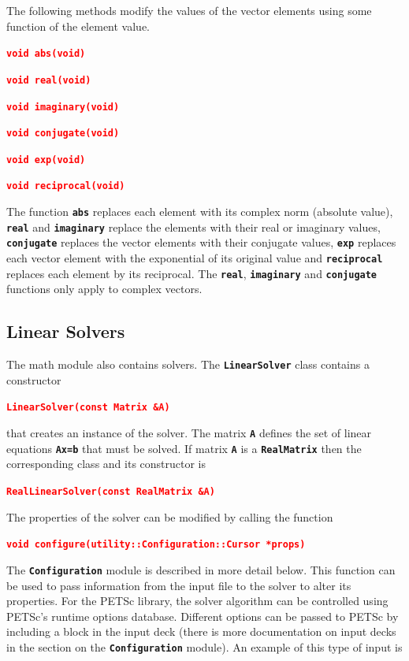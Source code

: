 \documentclass[12pt]{report} %
\begin{document}
The following methods modify the values of the vector elements using some function of the element value.

\textcolor{red}{\texttt{\textbf{void abs(void)}}}

\textcolor{red}{\texttt{\textbf{void real(void)}}}

\textcolor{red}{\texttt{\textbf{void imaginary(void)}}}

\textcolor{red}{\texttt{\textbf{void conjugate(void)}}}

\textcolor{red}{\texttt{\textbf{void exp(void)}}}

\textcolor{red}{\texttt{\textbf{void reciprocal(void)}}}

The function \texttt{\textbf{abs}} replaces each element with its complex norm (absolute value), \texttt{\textbf{real}} and \texttt{\textbf{imaginary}} replace the elements with their real or imaginary values, \texttt{\textbf{conjugate}} replaces the vector elements with their conjugate values, \texttt{\textbf{exp}} replaces each vector element with the exponential of its original value and \texttt{\textbf{reciprocal}} replaces each element by its reciprocal. The \texttt{\textbf{real}}, \texttt{\textbf{imaginary}} and \texttt{\textbf{conjugate}} functions only apply to complex vectors.

\subsection{Linear Solvers}

The math module also contains solvers. The \texttt{\textbf{LinearSolver}} class contains a constructor

\textcolor{red}{\texttt{\textbf{LinearSolver(const Matrix \&A)}}}

that creates an instance of the solver. The matrix \texttt{\textbf{A}} defines the set of linear equations \texttt{\textbf{Ax=b}} that must be solved. If matrix \texttt{\textbf{A}} is a \texttt{\textbf{RealMatrix}} then the corresponding class and its constructor is

\textcolor{red}{\texttt{\textbf{RealLinearSolver(const RealMatrix \&A)}}}

The properties of the solver can be modified by calling the function

\textcolor{red}{\texttt{\textbf{void configure(utility::Configuration::Cursor *props)}}}

The \texttt{\textbf{Configuration}} module is described in more detail below. This function can be used to pass information from the input file to the solver to alter its properties. For the PETSc library, the solver algorithm can be controlled using PETSc's runtime options database. Different options can be passed to PETSc by including a block in the input deck (there is more documentation on input decks in the section on the \texttt{\textbf{Configuration}} module). An example of this type of input is
\end{document}
